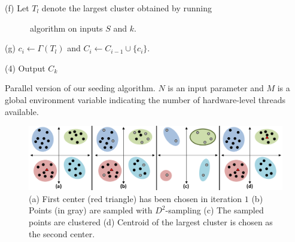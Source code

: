 \begin{center}
\begin{Algorithm}[h]
\begin{boxedminipage}{5.5in}
\hspace{0.3in} (f) Let $T_l$ denote the largest cluster obtained by running \kmpp

\hspace{0.3in}  \ \ \ \ \ \ algorithm on inputs $S$ and $k$.

\hspace{0.3in} (g) $c_i \leftarrow \Gamma(T_l)$ and $C_i \leftarrow C_{i-1} \cup \{c_i\}$. 

\hspace{0.1in} (4) Output $C_k$
\end{boxedminipage}
\caption{Parallel version of our seeding algorithm. $N$ is an input parameter and $M$ is a global environment variable indicating the number of hardware-level threads available.}
\label{fig:par-seed}
\end{Algorithm}
\end{center}


\begin{figure}
\centering
\includegraphics[scale=0.3]{illustration}
\caption{(a) First center (red triangle) has been chosen in iteration $1$ (b) Points (in gray) are sampled with $D^2$-sampling (c) The sampled points are clustered (d) Centroid of the largest cluster is chosen as the second center.}
\label{fig:illustration}
\end{figure}


